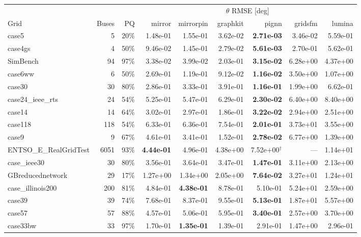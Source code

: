 \documentclass[10pt]{article}
\begin{document}
\begin{landscape}
\begin{table}[H]
\centering\scriptsize
\begin{tabular}{lrr rrrrrr}
\toprule
 & & & \multicolumn{6}{c}{$\theta$ RMSE [deg]} \\
\cmidrule(lr){4-9}
Grid & Buses & PQ & mirror & mirrorpin & graphkit & pignn & gridsfm & lumina \\
\midrule
case5 & 5 & 20\% & 1.48e-01 & 1.55e-01 & 3.62e-02 & \textbf{2.71e-03} & 3.46e-02 & 5.59e-01 \\
case4gs & 4 & 50\% & 9.46e-02 & 1.45e-01 & 2.79e-02 & \textbf{5.61e-03} & 2.70e-01 & 5.62e-01 \\
SimBench & 94 & 97\% & 3.38e-02 & 3.99e-02 & 2.03e-01 & \textbf{3.15e-02} & 6.28e+00 & 4.37e+00 \\
case6ww & 6 & 50\% & 2.69e-01 & 1.19e-01 & 9.12e-02 & \textbf{1.16e-02} & 3.50e+00 & 1.07e+00 \\
case30 & 30 & 80\% & 2.86e-01 & 3.33e-01 & 3.91e-01 & \textbf{1.16e-01} & 1.99e+00 & 6.62e-01 \\
case24\_ieee\_rts & 24 & 54\% & 5.25e-01 & 5.47e-01 & 6.29e-01 & \textbf{2.30e-02} & 6.40e+00 & 8.40e+00 \\
case14 & 14 & 64\% & 3.02e-01 & 2.97e-01 & 1.86e-01 & \textbf{3.22e-02} & 2.94e+00 & 2.51e+00 \\
case118 & 118 & 54\% & 6.33e-01 & 6.36e-01 & 7.54e-01 & \textbf{2.01e-01} & 3.73e+01 & 3.55e+00 \\
case9 & 9 & 67\% & 4.61e-01 & 3.41e-01 & 1.52e-01 & \textbf{2.78e-02} & 6.77e+00 & 1.39e+00 \\
ENTSO\_E\_RealGridTest & 6051 & 93\% & \textbf{4.44e-01} & 4.96e-01 & 4.38e+00 & 7.52e+00$^\dagger$ & --- & 1.14e+01 \\
case\_ieee30 & 30 & 80\% & 3.56e-01 & 3.64e-01 & 3.47e-01 & \textbf{1.47e-01} & 3.11e+00 & 2.13e+00 \\
GBreducednetwork & 29 & 17\% & 1.27e+00 & 1.34e+00 & 2.05e+00 & \textbf{7.64e-02} & 3.27e+01 & 1.24e+01 \\
case\_illinois200 & 200 & 81\% & 4.84e-01 & \textbf{4.38e-01} & 8.78e-01 & 5.10e-01 & 5.24e+01 & 2.59e+00 \\
case39 & 39 & 74\% & 7.68e-01 & 8.37e-01 & 9.55e-01 & \textbf{5.13e-01} & 1.87e+01 & 5.57e+00 \\
case57 & 57 & 88\% & 4.57e-01 & 5.06e-01 & 5.95e-01 & \textbf{3.40e-01} & 2.57e+00 & 3.70e+00 \\
case33bw & 33 & 97\% & 1.70e-01 & \textbf{1.35e-01} & 1.39e-01 & 2.91e-01 & 1.47e+00 & 2.96e-01 \\

\end{tabular}
\end{table}
\end{landscape}
\end{document}
